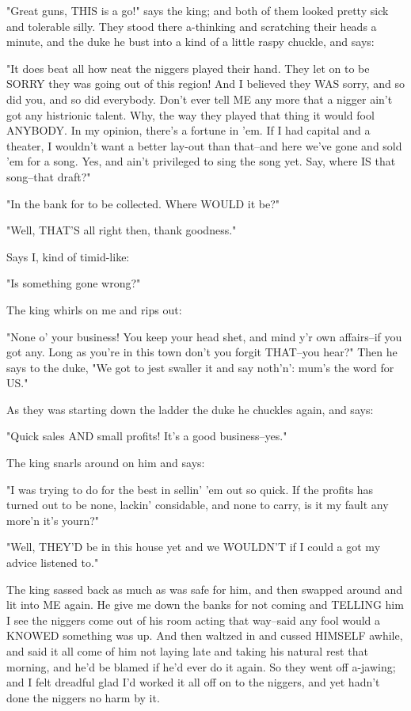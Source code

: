 "Great guns, THIS is a go!" says the king; and both of them looked pretty
sick and tolerable silly.  They stood there a-thinking and scratching
their heads a minute, and the duke he bust into a kind of a little raspy
chuckle, and says:

"It does beat all how neat the niggers played their hand.  They let on to
be SORRY they was going out of this region!  And I believed they WAS
sorry, and so did you, and so did everybody.  Don't ever tell ME any more
that a nigger ain't got any histrionic talent.  Why, the way they played
that thing it would fool ANYBODY.  In my opinion, there's a fortune in
'em.  If I had capital and a theater, I wouldn't want a better lay-out
than that--and here we've gone and sold 'em for a song.  Yes, and ain't
privileged to sing the song yet.  Say, where IS that song--that draft?"

"In the bank for to be collected.  Where WOULD it be?"

"Well, THAT'S all right then, thank goodness."

Says I, kind of timid-like:

"Is something gone wrong?"

The king whirls on me and rips out:

"None o' your business!  You keep your head shet, and mind y'r own
affairs--if you got any.  Long as you're in this town don't you forgit
THAT--you hear?"  Then he says to the duke, "We got to jest swaller it
and say noth'n':  mum's the word for US."

As they was starting down the ladder the duke he chuckles again, and
says:

"Quick sales AND small profits!  It's a good business--yes."

The king snarls around on him and says:

"I was trying to do for the best in sellin' 'em out so quick.  If the
profits has turned out to be none, lackin' considable, and none to carry,
is it my fault any more'n it's yourn?"

"Well, THEY'D be in this house yet and we WOULDN'T if I could a got my
advice listened to."

The king sassed back as much as was safe for him, and then swapped around
and lit into ME again.  He give me down the banks for not coming and
TELLING him I see the niggers come out of his room acting that way--said
any fool would a KNOWED something was up.  And then waltzed in and cussed
HIMSELF awhile, and said it all come of him not laying late and taking
his natural rest that morning, and he'd be blamed if he'd ever do it
again.  So they went off a-jawing; and I felt dreadful glad I'd worked it
all off on to the niggers, and yet hadn't done the niggers no harm by it.




